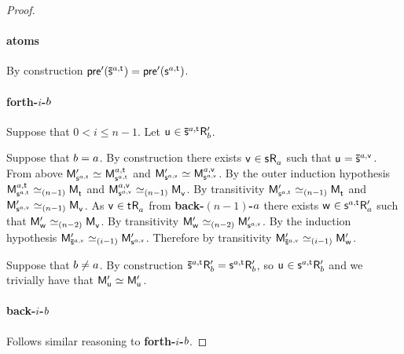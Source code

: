 \begin{proof}
\paragraph{atoms} By construction $\aPreconditionP(\aPStateS[\agentA, \aStateT]) = \aPreconditionP(\aStateS[\agentA,\aStateT])$.

\paragraph{forth-$i$-$b$} Suppose that $0 < i \leq n - 1$. Let $\aStateU \in \aPStateS[\agentA,\aStateT] \aAccessibilityP{\agentB}$. 

Suppose that $b = a$. 
By construction there exists $\aStateV \in \aStateS \aAccessibility{\agentA}$ such that $\aStateU = \aPStateS[\agentA,\aStateV]$.
From above $\aPModelP{\aStateS[\agentA,\aStateT]} \bisimilar \aPModel[\agentA,\aStateT]{\aStateS[\agentA,\aStateT]}$ and $\aPModelP{\aStateS[\agentA,\aStateV]} \bisimilar \aPModel[\agentA,\aStateV]{\aStateS[\agentA,\aStateV]}$.
By the outer induction hypothesis $\aPModel[\agentA,\aStateT]{\aStateS[\agentA,\aStateT]} \bisimilar[(n - 1)] \aPModel{\aStateT}$ and $\aPModel[\agentA,\aStateV]{\aStateS[\agentA,\aStateV]} \bisimilar[(n - 1)] \aPModel{\aStateV}$.
By transitivity $\aPModelP{\aStateS[\agentA,\aStateT]} \bisimilar[(n - 1)] \aPModel{\aStateT}$ and $\aPModelP{\aStateS[\agentA,\aStateV]} \bisimilar[(n - 1)] \aPModel{\aStateV}$.
As $\aStateV \in \aStateT \aAccessibility{\agentA}$ from {\bf back-$(n - 1)$-$a$} there exists $\aStateW \in \aStateS[\agentA,\aStateT] \aAccessibilityP{\agentA}$ such that $\aPModelP{\aStateW} \bisimilar[(n - 2)] \aPModel{\aStateV}$.
By transitivity $\aPModelP{\aStateW} \bisimilar[(n - 2)] \aPModelP{\aStateS[\agentA,\aStateV]}$.
By the induction hypothesis $\aPModelP{\aPStateS[\agentA,\aStateV]} \bisimilar[(i - 1)] \aPModelP{\aStateS[\agentA,\aStateV]}$.
Therefore by transitivity $\aPModelP{\aPStateS[\agentA,\aStateV]} \bisimilar[(i - 1)] \aPModelP{\aStateW}$.

Suppose that $b \neq a$.
By construction $\aPStateS[\agentA,\aStateT] \aAccessibilityP{\agentB} = \aStateS[\agentA,\aStateT] \aAccessibilityP{\agentB}$, so $\aStateU \in \aStateS[\agentA,\aStateT] \aAccessibilityP{\agentB}$ and we trivially have that $\aPModelP{\aStateU} \bisimilar \aPModelP{\aStateU}$.

\paragraph{back-$i$-$b$} Follows similar reasoning to {\bf forth-$i$-$b$}.


\end{proof}
